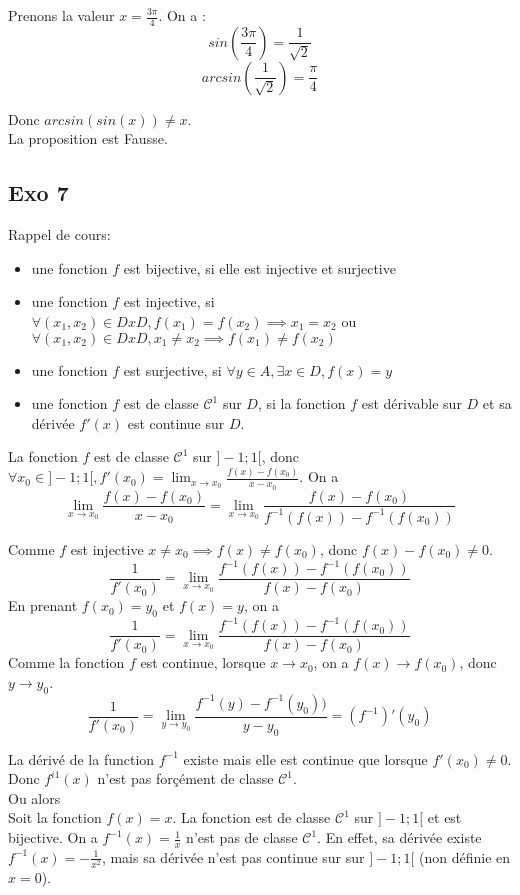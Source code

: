 \documentclass[]{book}
\theoremstyle{definition}
\begin{document}
Prenons la valeur $x=\frac{3\pi}{4}$. On a :
$$sin(\frac{3\pi}{4}) = \frac{1}{\sqrt{2}}$$
$$arcsin(\frac{1}{\sqrt{2}}) = \frac{\pi}{4}$$

Donc $arcsin(sin(x)) \neq x$.\\

La proposition est Fausse.

\subsection*{Exo 7}
Rappel de cours:\\
\begin{itemize}
\item une fonction $f$ est bijective, si elle est injective et surjective
\item une fonction $f$ est injective, si $\forall (x_1, x_2) \in D x D, f(x_1) = f(x_2) \implies x_1 = x_2$ ou $\forall (x_1, x_2) \in D x D, x_1 \neq x_2 \implies f(x_1) \neq f(x_2)$
\item une fonction $f$ est surjective, si $\forall y \in A, \exists x \in D, f(x) = y$ 
\item une fonction $f$ est de classe $\mathcal{C}^1$ sur $D$, si la fonction $f$ est d\'erivable sur $D$ et sa d\'eriv\'ee $f'(x)$ est continue sur $D$.
\end{itemize}

La fonction $f$ est de classe $\mathcal{C}^1$ sur $]-1;1[$, donc $\forall x_0 \in ]-1;1[, f'(x_0) = \lim_{x \to x_0}\frac{f(x) - f(x_0)}{x-x_0}$.
On a 
$$\lim_{x \to x_0}\frac{f(x) - f(x_0)}{x-x_0} = \lim_{x \to x_0}\frac{f(x) - f(x_0)}{f^{-1}(f(x)) - f^{-1}(f(x_0))}$$

Comme $f$ est injective $x \neq x_0 \implies f(x) \neq f(x_0)$, donc $f(x)-f(x_0) \neq 0$.\\
$$\frac{1}{f'(x_0)} = \lim_{x \to x_0}\frac{f^{-1}(f(x)) - f^{-1}(f(x_0))}{f(x) - f(x_0)}$$
En prenant $f(x_0) = y_0$ et $f(x) = y$, on a 
$$\frac{1}{f'(x_0)} = \lim_{x \to x_0}\frac{f^{-1}(f(x)) - f^{-1}(f(x_0))}{f(x) - f(x_0)}$$
Comme la fonction $f$ est continue, lorsque $x \to x_0$, on a $f(x) \to f(x_0)$, donc $y \to y_0$.
$$\frac{1}{f'(x_0)} = \lim_{y \to y_0}\frac{f^{-1}(y) - f^{-1}(y_0))}{y - y_0} = (f^{-1})'(y_0)$$

La d\'eriv\'e de la function $f^{-1}$ existe mais elle est continue que lorsque $f'(x_0) \neq 0$. Donc $f^{i1}(x)$ n'est pas for\c{c}\'ement de classe $\mathcal{C}^1$.\\


Ou alors \\
Soit la fonction $f(x) = x$. La fonction est de classe $\mathcal{C}^1$ sur $]-1;1[$ et est bijective. On a $f^{-1}(x) = \frac{1}{x}$ n'est pas de classe $\mathcal{C}^1$. En effet, sa d\'eriv\'ee existe $f^{-1}(x) = -\frac{1}{x^2}$, mais sa d\'eriv\'ee n'est pas continue sur sur $]-1;1[$ (non d\'efinie en $x=0$).\\ 
\end{document}
